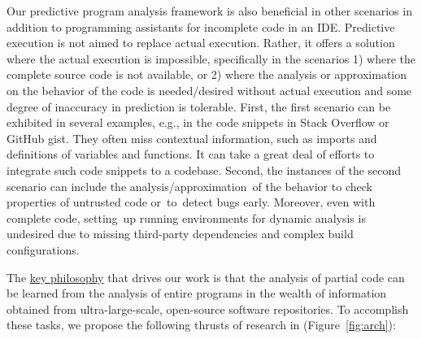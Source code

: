 Our predictive program analysis framework is also beneficial in other
scenarios in addition to programming assistants for incomplete code in
an IDE. Predictive execution is not aimed to replace actual
execution. Rather, it offers a solution where the actual execution is
impossible, specifically in the scenarios 1) where the complete source
code is not available, or 2) where the analysis or approximation on
the behavior of the code is needed/desired without actual execution
and some degree of inaccuracy in prediction is tolerable.  First, the
first scenario can be exhibited in several examples, e.g., in the code
snippets in Stack Overflow or GitHub gist. They often miss contextual
information, such as imports and definitions of variables and
functions. It can take a great deal of efforts to integrate such code
snippets to a codebase.
Second, the instances of the second scenario can include the
analysis/approximation~of the behavior to check properties of
untrusted code or~to~detect bugs early. Moreover, even with complete
code, setting~up running environments for dynamic analysis is
undesired due to missing third-party dependencies and complex build
configurations.

The \underline{key philosophy} that drives our work is that the analysis of
partial code can be learned from the analysis of entire programs in
the wealth of information obtained from ultra-large-scale, open-source
software repositories. To accomplish these tasks, we propose the
following thrusts of research in {\tool} (Figure~\ref{fig:arch}):

